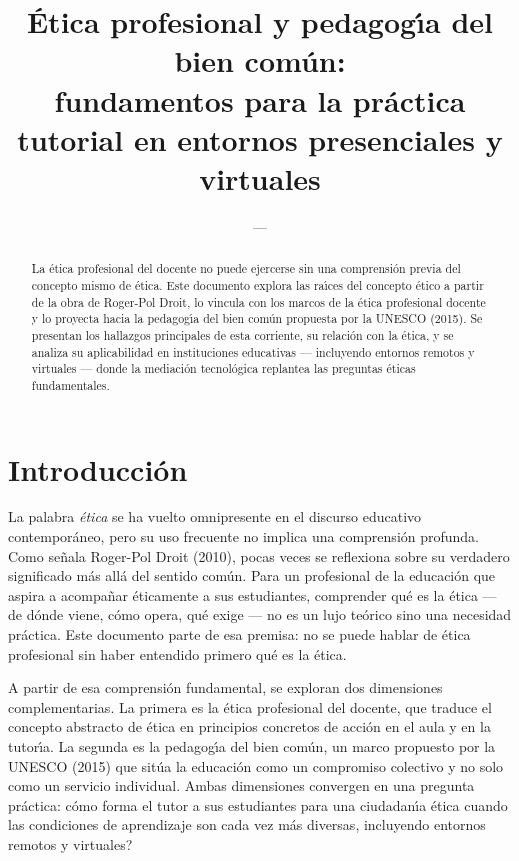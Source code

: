 \documentclass[12pt,letterpaper]{article}
\title{\'Etica profesional y pedagog\'{\i}a del bien com\'{u}n:\\ fundamentos para la pr\'actica tutorial en entornos presenciales y virtuales}
\author{---}
\date{}
\begin{document}
\maketitle

\begin{abstract}
La \'etica profesional del docente no puede ejercerse sin una comprensi\'on previa del concepto mismo de \'etica. Este documento explora las ra\'{\i}ces del concepto \'etico a partir de la obra de Roger-Pol Droit, lo vincula con los marcos de la \'etica profesional docente y lo proyecta hacia la pedagog\'{\i}a del bien com\'un propuesta por la UNESCO (2015). Se presentan los hallazgos principales de esta corriente, su relaci\'on con la \'etica, y se analiza su aplicabilidad en instituciones educativas --- incluyendo entornos remotos y virtuales --- donde la mediaci\'on tecnol\'ogica replantea las preguntas \'eticas fundamentales.
\end{abstract}

\section{Introducci\'on}

La palabra \textit{\'etica} se ha vuelto omnipresente en el discurso educativo contempor\'aneo, pero su uso frecuente no implica una comprensi\'on profunda. Como se\~nala Roger-Pol Droit (2010), pocas veces se reflexiona sobre su verdadero significado m\'as all\'a del sentido com\'un. Para un profesional de la educaci\'on que aspira a acompa\~nar \'eticamente a sus estudiantes, comprender qu\'e es la \'etica --- de d\'onde viene, c\'omo opera, qu\'e exige --- no es un lujo te\'orico sino una necesidad pr\'actica. Este documento parte de esa premisa: no se puede hablar de \'etica profesional sin haber entendido primero qu\'e es la \'etica.

A partir de esa comprensi\'on fundamental, se exploran dos dimensiones complementarias. La primera es la \'etica profesional del docente, que traduce el concepto abstracto de \'etica en principios concretos de acci\'on en el aula y en la tutor\'{\i}a. La segunda es la pedagog\'{\i}a del bien com\'un, un marco propuesto por la UNESCO (2015) que sit\'ua la educaci\'on como un compromiso colectivo y no solo como un servicio individual. Ambas dimensiones convergen en una pregunta pr\'actica: \textquestiondown c\'omo forma el tutor a sus estudiantes para una ciudadan\'{\i}a \'etica cuando las condiciones de aprendizaje son cada vez m\'as diversas, incluyendo entornos remotos y virtuales?
\end{document}

